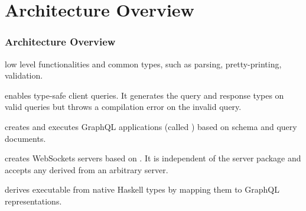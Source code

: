 \section{Architecture Overview}

\begin{frame}[allowframebreaks]\frametitle{Architecture Overview}

\begin{enumerate} 

  \footnotesize
  
   low level functionalities and common types, such as  parsing, pretty-printing, validation.

   enables type-safe client queries. It generates the query and response types on valid queries but throws a compilation error on the invalid query.

   creates and executes GraphQL applications (called ) based on schema and query documents.
  
    creates WebSockets servers based on . It is independent of the server package and accepts any  derived from an arbitrary server.

   derives executable  from native Haskell types by mapping them to GraphQL representations. 

\end{enumerate}


\end{frame}
